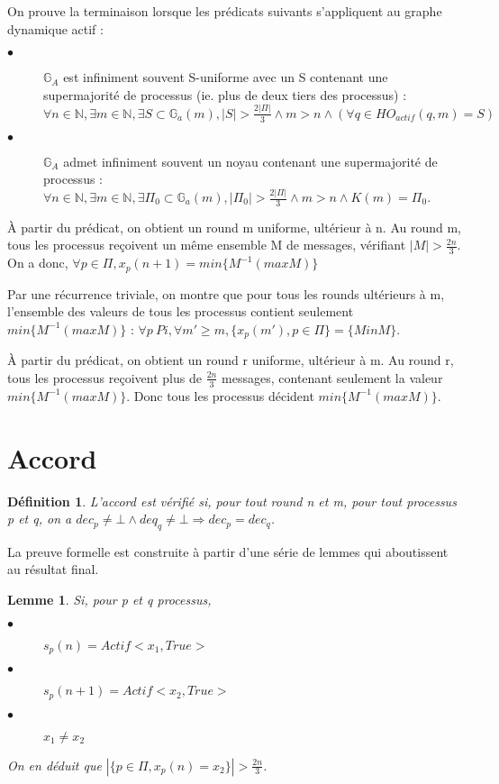 \documentclass{article}
\newtheorem{lemma}{Lemme}
\newtheorem{definition}{Définition}
\begin{document}
On prouve la terminaison lorsque les prédicats suivants s'appliquent au graphe dynamique actif :
\begin{description}
	\item[$\bullet$] $\mathds{G}_A$ est infiniment souvent S-uniforme avec un S contenant une supermajorité de processus (ie. plus de deux tiers des processus) :
		$\forall n \in \mathds{N}, \exists m \in \mathds{N}, \exists S \subset \mathds{G}_a(m), |S| > \frac{2 |\Pi|}{3} \wedge m > n \wedge (\forall q \in HO_{actif}(q, m) = S)$
	\item[$\bullet$] $\mathds{G}_A$ admet infiniment souvent un noyau contenant une supermajorité de processus :
		$\forall n \in \mathds{N}, \exists m \in \mathds{N}, \exists \Pi_0 \subset \mathds{G}_a(m), |\Pi_0| > \frac{2 |\Pi|}{3} \wedge m > n \wedge K(m) = \Pi_0$.
\end{description}

À partir du prédicat, on obtient un round m uniforme, ultérieur à n. Au round m, tous les processus reçoivent un même ensemble M de messages, vérifiant $| M | > \frac{2n}{3}$. On a donc, $\forall p \in \Pi, x_p(n+1) = min \{M^{-1} (max M)\}$

Par une récurrence triviale, on montre que pour tous les rounds ultérieurs à m, l'ensemble des valeurs de tous les processus contient seulement $min \{M^{-1} (max M)\}$ : $\forall p \ Pi, \forall m' \geq m, \{x_p(m'), p \in \Pi \} = \{Min M\}$.

À partir du prédicat, on obtient un round r uniforme, ultérieur à m. Au round r, tous les processus reçoivent plus de $\frac{2n}{3}$ messages, contenant seulement la valeur $min \{M^{-1} (max M)\}$. Donc tous les processus décident $min \{M^{-1} (max M)\}$.

\section{Accord}

\begin{definition}
	L'accord est vérifié si, pour tout round n et m, pour tout processus p et q, on a $dec_p \neq \bot \wedge deq_q \neq \bot \Rightarrow dec_p = dec_q$.
\end{definition}

La preuve formelle est construite à partir d'une série de lemmes qui aboutissent au résultat final.

\begin{lemma}

Si, pour p et q processus,

\begin{description}

\item[$\bullet$] $s_p(n) = Actif <x_1, True>$
\item[$\bullet$] $s_p(n+1) = Actif <x_2, True>$
\item[$\bullet$] $x_1 \neq x_2$

\end{description}

On en déduit que $| \{ p \in \Pi , x_p(n) = x_2 \} | > \frac{2n}{3}$.

\end{lemma}
\end{document}
